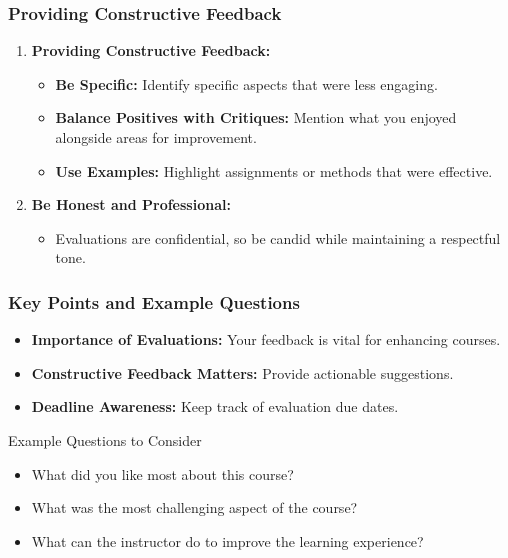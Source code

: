 \documentclass[aspectratio=169]{beamer}
\begin{document}
\begin{frame}[fragile]
    \frametitle{Providing Constructive Feedback}
    \begin{enumerate}[resume]
        \item \textbf{Providing Constructive Feedback:}
        \begin{itemize}
            \item \textbf{Be Specific:} Identify specific aspects that were less engaging.
            \item \textbf{Balance Positives with Critiques:} Mention what you enjoyed alongside areas for improvement.
            \item \textbf{Use Examples:} Highlight assignments or methods that were effective.
        \end{itemize}
        
        \item \textbf{Be Honest and Professional:}
        \begin{itemize}
            \item Evaluations are confidential, so be candid while maintaining a respectful tone.
        \end{itemize}
    \end{enumerate}
\end{frame}

\begin{frame}[fragile]
    \frametitle{Key Points and Example Questions}
    \begin{itemize}
        \item \textbf{Importance of Evaluations:} Your feedback is vital for enhancing courses.
        \item \textbf{Constructive Feedback Matters:} Provide actionable suggestions.
        \item \textbf{Deadline Awareness:} Keep track of evaluation due dates.
    \end{itemize}
    
    \begin{block}{Example Questions to Consider}
        \begin{itemize}
            \item What did you like most about this course?
            \item What was the most challenging aspect of the course?
            \item What can the instructor do to improve the learning experience?
        \end{itemize}
    \end{block}
\end{frame}
\end{document}
